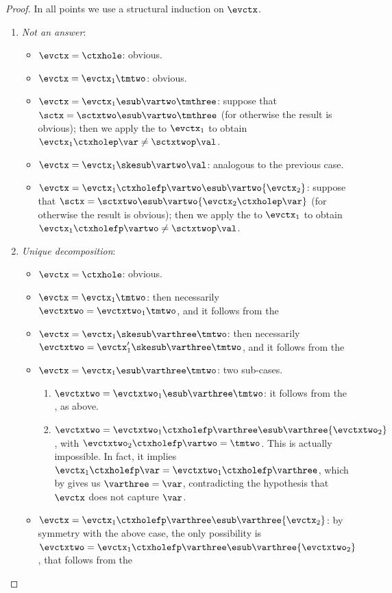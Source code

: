 \begin{proof}
	In all points we use a structural induction on $\evctx$. 
	\begin{enumerate}
	\item \emph{Not an answer}:
	\begin{itemize}
		\item $\evctx=\ctxhole$: obvious.
		\item $\evctx=\evctx_1\tmtwo$: obvious.
		\item $\evctx=\evctx_1\esub\vartwo\tmthree$: suppose that $\sctx=\sctxtwo\esub\vartwo\tmthree$ (for otherwise the result is obvious); then we apply the \ih to $\evctx_1$ to obtain $\evctx_1\ctxholep\var\neq\sctxtwop\val$.
		\item $\evctx=\evctx_1\skesub\vartwo\val$: analogous to the previous case.
		\item $\evctx=\evctx_1\ctxholefp\vartwo\esub\vartwo{\evctx_2}$: suppose that $\sctx=\sctxtwo\esub\vartwo{\evctx_2\ctxholep\var}$ (for otherwise the result is obvious); then we apply the \ih to $\evctx_1$ to obtain $\evctx_1\ctxholefp\vartwo\neq\sctxtwop\val$.
	\end{itemize}
	
\item \emph{Unique decomposition}:
	\begin{itemize}
		\item $\evctx=\ctxhole$: obvious.
		\item $\evctx=\evctx_1\tmtwo$: then necessarily $\evctxtwo=\evctxtwo_1\tmtwo$, and it follows from the \ih
		\item $\evctx=\evctx_1\skesub\varthree\tmtwo$: then necessarily $\evctxtwo=\evctx_1'\skesub\varthree\tmtwo$, and it follows from the \ih
		\item $\evctx=\evctx_1\esub\varthree\tmtwo$: two sub-cases. 
		\begin{enumerate}
		\item $\evctxtwo=\evctxtwo_1\esub\varthree\tmtwo$: it follows from the \ih, as above.
		\item $\evctxtwo=\evctxtwo_1\ctxholefp\varthree\esub\varthree{\evctxtwo_2}$, with $\evctxtwo_2\ctxholefp\vartwo=\tmtwo$. This is actually impossible. In fact, it implies $\evctx_1\ctxholefp\var=\evctxtwo_1\ctxholefp\varthree$, which by \ih gives us $\varthree=\var$, contradicting the hypothesis that $\evctx$ does not capture $\var$.
		\end{enumerate}
		\item $\evctx=\evctx_1\ctxholefp\varthree\esub\varthree{\evctx_2}$: by symmetry with the above case, the only possibility is $\evctxtwo=\evctx_1\ctxholefp\varthree\esub\varthree{\evctxtwo_2}$, that follows from the \ih
	\end{itemize}


\end{enumerate}
\end{proof}
